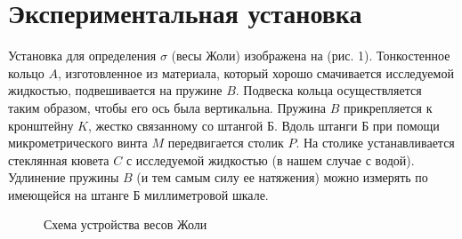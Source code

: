 \documentclass[a4paper,11.5pt]{article} %
\begin{document}
\section{Экспериментальная установка}

Установка для определения $\sigma$ (весы Жоли) изображена на (рис. 1). Тонкостенное кольцо $A$, изготовленное из материала, который  хорошо смачивается исследуемой жидкостью, подвешивается на пружине $B$. Подвеска кольца осуществляется таким образом, чтобы его ось была вертикальна. Пружина $B$ прикрепляется к кронштейну $K$, жестко связанному со штангой $\text{Б}$. Вдоль штанги $\text{Б}$ при помощи микрометрического винта $M$ передвигается столик $P$. На столике устанавливается стеклянная кювета $C$ с исследуемой жидкостью (в нашем случае с водой). Удлинение пружины $B$ (и тем самым силу ее натяжения) можно измерять по имеющейся на штанге $\text{Б}$ миллиметровой шкале.

\begin{figure}[h]
	\caption{Схема устройства весов Жоли}
	\label{pic:1}
\end{figure}
\end{document}

